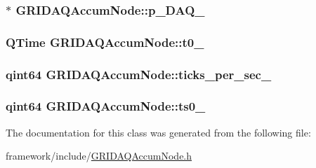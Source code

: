 \hypertarget{classGRIDAQAccumNode_af4b9be7b1c593e0201bc1b8b56f325f6}{
\subsubsection[{p\-\_\-\-D\-A\-Q\-\_\-}]{$\ast$ {\bf \-G\-R\-I\-D\-A\-Q\-Accum\-Node\-::p\-\_\-\-D\-A\-Q\-\_\-}}}\label{classGRIDAQAccumNode_af4b9be7b1c593e0201bc1b8b56f325f6}
\hypertarget{classGRIDAQAccumNode_a141321b040b79b72b4dd64da62266641}{
\subsubsection[{t0\-\_\-}]{\setlength{\rightskip}{0pt plus 5cm}\-Q\-Time {\bf \-G\-R\-I\-D\-A\-Q\-Accum\-Node\-::t0\-\_\-}}}\label{classGRIDAQAccumNode_a141321b040b79b72b4dd64da62266641}
\hypertarget{classGRIDAQAccumNode_a8ff6ba9390ba1b25c08dce5c4ad4a20b}{
\subsubsection[{ticks\-\_\-per\-\_\-sec\-\_\-}]{\setlength{\rightskip}{0pt plus 5cm}qint64 {\bf \-G\-R\-I\-D\-A\-Q\-Accum\-Node\-::ticks\-\_\-per\-\_\-sec\-\_\-}}}\label{classGRIDAQAccumNode_a8ff6ba9390ba1b25c08dce5c4ad4a20b}
\hypertarget{classGRIDAQAccumNode_ab230f8bb0395f382d9a2880800819f13}{
\subsubsection[{ts0\-\_\-}]{\setlength{\rightskip}{0pt plus 5cm}qint64 {\bf \-G\-R\-I\-D\-A\-Q\-Accum\-Node\-::ts0\-\_\-}}}\label{classGRIDAQAccumNode_ab230f8bb0395f382d9a2880800819f13}


\-The documentation for this class was generated from the following file\-:\begin{DoxyCompactItemize}
\item 
framework/include/\hyperlink{GRIDAQAccumNode_8h}{\-G\-R\-I\-D\-A\-Q\-Accum\-Node.\-h}\end{DoxyCompactItemize}
